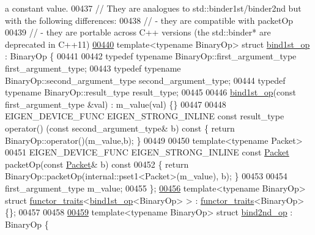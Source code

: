 \begin{DoxyCode}
{       a constant value.}
00437 \textcolor{comment}{// They are analogues to std::binder1st/binder2nd but with the following differences:}
00438 \textcolor{comment}{//  - they are compatible with packetOp}
00439 \textcolor{comment}{//  - they are portable across C++ versions (the std::binder* are deprecated in C++11)}
\hyperlink{struct_eigen_1_1internal_1_1bind1st__op}{00440} \textcolor{keyword}{template}<\textcolor{keyword}{typename} BinaryOp> \textcolor{keyword}{struct }\hyperlink{struct_eigen_1_1internal_1_1bind1st__op}{bind1st\_op} : BinaryOp \{
00441 
00442   \textcolor{keyword}{typedef} \textcolor{keyword}{typename} BinaryOp::first\_argument\_type  first\_argument\_type;
00443   \textcolor{keyword}{typedef} \textcolor{keyword}{typename} BinaryOp::second\_argument\_type second\_argument\_type;
00444   \textcolor{keyword}{typedef} \textcolor{keyword}{typename} BinaryOp::result\_type          result\_type;
00445 
00446   \hyperlink{struct_eigen_1_1internal_1_1bind1st__op}{bind1st\_op}(\textcolor{keyword}{const} first\_argument\_type &val) : m\_value(val) \{\}
00447 
00448   EIGEN\_DEVICE\_FUNC EIGEN\_STRONG\_INLINE \textcolor{keyword}{const} result\_type operator() (\textcolor{keyword}{const} second\_argument\_type& b)\textcolor{keyword}{ const }
      \{ \textcolor{keywordflow}{return} BinaryOp::operator()(m\_value,b); \}
00449 
00450   \textcolor{keyword}{template}<\textcolor{keyword}{typename} Packet>
00451   EIGEN\_DEVICE\_FUNC EIGEN\_STRONG\_INLINE \textcolor{keyword}{const} \hyperlink{union_eigen_1_1internal_1_1_packet}{Packet} packetOp(\textcolor{keyword}{const} \hyperlink{union_eigen_1_1internal_1_1_packet}{Packet}& b)\textcolor{keyword}{ const}
00452 \textcolor{keyword}{  }\{ \textcolor{keywordflow}{return} BinaryOp::packetOp(internal::pset1<Packet>(m\_value), b); \}
00453 
00454   first\_argument\_type m\_value;
00455 \};
\hyperlink{struct_eigen_1_1internal_1_1functor__traits_3_01bind1st__op_3_01_binary_op_01_4_01_4}{00456} \textcolor{keyword}{template}<\textcolor{keyword}{typename} BinaryOp> \textcolor{keyword}{struct }\hyperlink{struct_eigen_1_1internal_1_1functor__traits}{functor\_traits}<\hyperlink{struct_eigen_1_1internal_1_1bind1st__op}{bind1st\_op}<BinaryOp> > : 
      \hyperlink{struct_eigen_1_1internal_1_1functor__traits}{functor\_traits}<BinaryOp> \{\};
00457 
00458 
\hyperlink{struct_eigen_1_1internal_1_1bind2nd__op}{00459} \textcolor{keyword}{template}<\textcolor{keyword}{typename} BinaryOp> \textcolor{keyword}{struct }\hyperlink{struct_eigen_1_1internal_1_1bind2nd__op}{bind2nd\_op} : BinaryOp \{

\end{DoxyCode}

